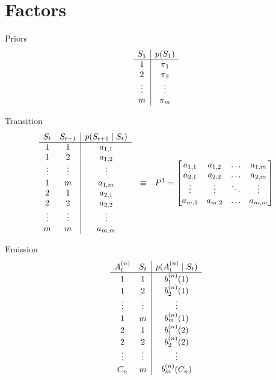 \section{Factors}

Priors
\[
\begin{array}{c | c}
S_1 & p(S_1) \\ 
\hline
1 & \pi_1 \\ 
2 & \pi_2 \\ 
\vdots & \vdots \\
m & \pi_m \\ 
\end{array} 
\]

Transition
\[
\begin{array}{ccc}
\begin{array}{c c | c}
S_t & S_{t+1} & p(S_{t+1} \mid S_t) \\ 
\hline
1 & 1  & a_{1,1} \\ 
1 & 2  & a_{1,2} \\ 
\vdots & \vdots  & \vdots \\
1 & m  & a_{1,m} \\ 
2 & 1  & a_{2,1} \\ 
2 & 2  & a_{2,2} \\ 
\vdots & \vdots  & \vdots \\
m & m  & a_{m,m} \\ 
\end{array} 
&
\equiv
&
P^1 = 
\begin{bmatrix}
a_{1,1} & a_{1,2} & \dots & a_{1,m} \\
a_{2,1} & a_{2,2} & \dots & a_{2,m} \\
\vdots & \vdots & \ddots & \vdots \\
a_{m,1} & a_{m,2} & \dots & a_{m,m} \\
\end{bmatrix}
\end{array} 
\]


Emission
\[
\begin{array}{c c | c}
A^{(n)}_t & S_t & p(A^{(n)}_t \mid S_t) \\ 
\hline
1 & 1  & b_1^{(n)}(1) \\ 
1 & 2  & b_2^{(n)}(1) \\ 
\vdots & \vdots  & \vdots \\
1 & m  & b_m^{(n)}(1) \\ 
2 & 1  & b_1^{(n)}(2) \\ 
2 & 2  & b_2^{(n)}(2) \\ 
\vdots & \vdots  & \vdots \\
C_n & m  & b_m^{(n)}(C_n) \\ 
\end{array} 
\]


